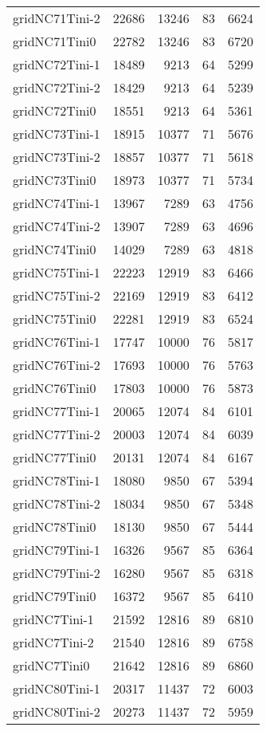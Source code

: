 \begin{longtable}{lrrrr}
gridNC71Tini-2 & 22686 & 13246 & 83 & 6624 \\
gridNC71Tini0 & 22782 & 13246 & 83 & 6720 \\
gridNC72Tini-1 & 18489 & 9213 & 64 & 5299 \\
gridNC72Tini-2 & 18429 & 9213 & 64 & 5239 \\
gridNC72Tini0 & 18551 & 9213 & 64 & 5361 \\
gridNC73Tini-1 & 18915 & 10377 & 71 & 5676 \\
gridNC73Tini-2 & 18857 & 10377 & 71 & 5618 \\
gridNC73Tini0 & 18973 & 10377 & 71 & 5734 \\
gridNC74Tini-1 & 13967 & 7289 & 63 & 4756 \\
gridNC74Tini-2 & 13907 & 7289 & 63 & 4696 \\
gridNC74Tini0 & 14029 & 7289 & 63 & 4818 \\
gridNC75Tini-1 & 22223 & 12919 & 83 & 6466 \\
gridNC75Tini-2 & 22169 & 12919 & 83 & 6412 \\
gridNC75Tini0 & 22281 & 12919 & 83 & 6524 \\
gridNC76Tini-1 & 17747 & 10000 & 76 & 5817 \\
gridNC76Tini-2 & 17693 & 10000 & 76 & 5763 \\
gridNC76Tini0 & 17803 & 10000 & 76 & 5873 \\
gridNC77Tini-1 & 20065 & 12074 & 84 & 6101 \\
gridNC77Tini-2 & 20003 & 12074 & 84 & 6039 \\
gridNC77Tini0 & 20131 & 12074 & 84 & 6167 \\
gridNC78Tini-1 & 18080 & 9850 & 67 & 5394 \\
gridNC78Tini-2 & 18034 & 9850 & 67 & 5348 \\
gridNC78Tini0 & 18130 & 9850 & 67 & 5444 \\
gridNC79Tini-1 & 16326 & 9567 & 85 & 6364 \\
gridNC79Tini-2 & 16280 & 9567 & 85 & 6318 \\
gridNC79Tini0 & 16372 & 9567 & 85 & 6410 \\
gridNC7Tini-1 & 21592 & 12816 & 89 & 6810 \\
gridNC7Tini-2 & 21540 & 12816 & 89 & 6758 \\
gridNC7Tini0 & 21642 & 12816 & 89 & 6860 \\
gridNC80Tini-1 & 20317 & 11437 & 72 & 6003 \\
gridNC80Tini-2 & 20273 & 11437 & 72 & 5959 \\

\end{longtable}
